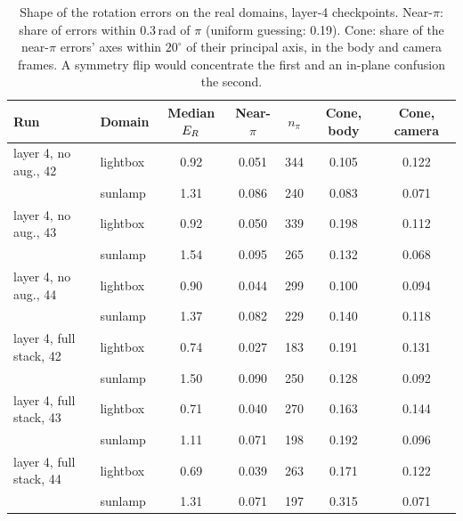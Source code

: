 \begin{table}[ht]
  \caption{Shape of the rotation errors on the real domains, layer-4 checkpoints. Near-$\pi$: share of errors within 0.3\,rad of $\pi$ (uniform guessing: 0.19). Cone: share of the near-$\pi$ errors' axes within $20^{\circ}$ of their principal axis, in the body and camera frames. A symmetry flip would concentrate the first and an in-plane confusion the second.}
  \label{tab:rotshape}
  \centering
  \scriptsize
  \setlength{\tabcolsep}{4pt}
  \begin{tabular}{l l c c c cc}
    \toprule
    Run & Domain & Median $E_{R}$ & Near-$\pi$ & $n_{\pi}$ & Cone, body & Cone, camera \\
    \midrule
    layer 4, no aug., 42 & lightbox & 0.92 & 0.051 & 344 & 0.105 & 0.122 \\
     & sunlamp & 1.31 & 0.086 & 240 & 0.083 & 0.071 \\
    layer 4, no aug., 43 & lightbox & 0.92 & 0.050 & 339 & 0.198 & 0.112 \\
     & sunlamp & 1.54 & 0.095 & 265 & 0.132 & 0.068 \\
    layer 4, no aug., 44 & lightbox & 0.90 & 0.044 & 299 & 0.100 & 0.094 \\
     & sunlamp & 1.37 & 0.082 & 229 & 0.140 & 0.118 \\
    layer 4, full stack, 42 & lightbox & 0.74 & 0.027 & 183 & 0.191 & 0.131 \\
     & sunlamp & 1.50 & 0.090 & 250 & 0.128 & 0.092 \\
    layer 4, full stack, 43 & lightbox & 0.71 & 0.040 & 270 & 0.163 & 0.144 \\
     & sunlamp & 1.11 & 0.071 & 198 & 0.192 & 0.096 \\
    layer 4, full stack, 44 & lightbox & 0.69 & 0.039 & 263 & 0.171 & 0.122 \\
     & sunlamp & 1.31 & 0.071 & 197 & 0.315 & 0.071 \\
    \bottomrule
  \end{tabular}
\end{table}
